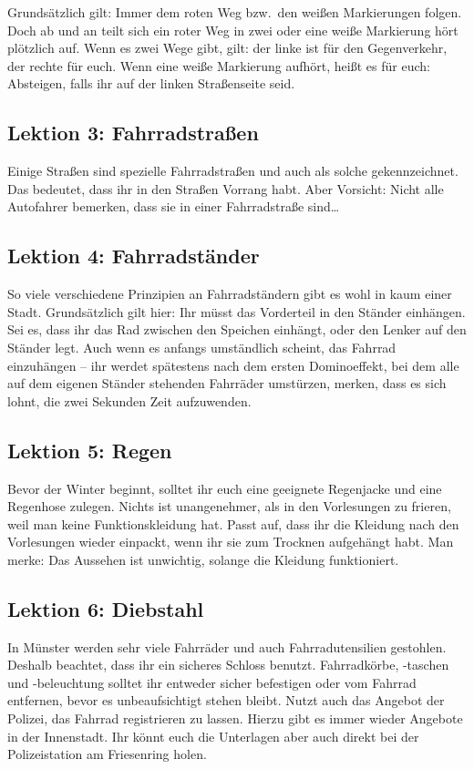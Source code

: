 \begin{multicols}{2}
Grundsätzlich gilt: Immer dem roten Weg bzw.\ den weißen Markierungen folgen.
Doch ab und an teilt sich ein roter Weg in zwei oder eine weiße Markierung hört plötzlich auf.
Wenn es zwei Wege gibt, gilt: der linke ist für den Gegenverkehr, der rechte für euch.
Wenn eine weiße Markierung aufhört, heißt es für euch: Absteigen, falls ihr auf der linken Straßenseite seid.

\subsection{Lektion 3: Fahrradstraßen}
Einige Straßen sind spezielle Fahrradstraßen und auch als solche gekennzeichnet.
Das bedeutet, dass ihr in den Straßen Vorrang habt.
Aber Vorsicht: Nicht alle Autofahrer bemerken, dass sie in einer Fahrradstraße sind\dots

\subsection{Lektion 4: Fahrradständer}
So viele verschiedene Prinzipien an Fahrradständern gibt es wohl in kaum einer Stadt.
Grundsätzlich gilt hier: Ihr müsst das Vorderteil in den Ständer einhängen.
Sei es, dass ihr das Rad zwischen den Speichen einhängt, oder den Lenker auf den Ständer legt.
Auch wenn es anfangs umständlich scheint, das Fahrrad einzuhängen -- ihr werdet spätestens nach dem ersten Dominoeffekt, bei dem alle auf dem eigenen Ständer stehenden Fahrräder umstürzen, merken, dass es sich lohnt, die zwei Sekunden Zeit aufzuwenden.

\subsection{Lektion 5: Regen}
Bevor der Winter beginnt, solltet ihr euch eine geeignete Regenjacke und eine Regenhose zulegen.
Nichts ist unangenehmer, als in den Vorlesungen zu frieren, weil man keine Funktionskleidung hat.
Passt auf, dass ihr die Kleidung nach den Vorlesungen wieder einpackt, wenn ihr sie zum Trocknen aufgehängt habt.
Man merke: Das Aussehen ist unwichtig, solange die Kleidung funktioniert.

\subsection{Lektion 6: Diebstahl}
In Münster werden sehr viele Fahrräder und auch Fahrradutensilien gestohlen.
Deshalb beachtet, dass ihr ein sicheres Schloss benutzt.
Fahrradkörbe, -taschen und -beleuchtung solltet ihr entweder sicher befestigen oder vom Fahrrad entfernen, bevor es unbeaufsichtigt stehen bleibt.
Nutzt auch das Angebot der Polizei, das Fahrrad registrieren zu lassen.
Hierzu gibt es immer wieder Angebote in der Innenstadt.
Ihr könnt euch die Unterlagen aber auch direkt bei der Polizeistation am Friesenring holen.


\end{multicols}
